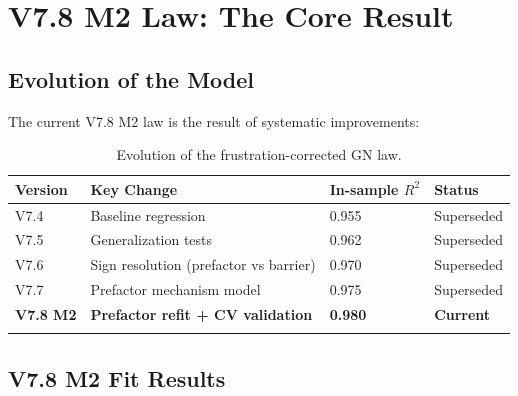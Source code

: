 \documentclass[11pt,a4paper]{article}
\begin{document}
\section{V7.8 M2 Law: The Core Result}
\label{sec:v78_m2}

\subsection{Evolution of the Model}

The current V7.8 M2 law is the result of systematic improvements:

\begin{longtable}{llll}
\toprule
\textbf{Version} & \textbf{Key Change} & \textbf{In-sample $R^2$} & \textbf{Status} \\
\midrule
\endhead
V7.4 & Baseline regression & 0.955 & Superseded \\
V7.5 & Generalization tests & 0.962 & Superseded \\
V7.6 & Sign resolution (prefactor vs barrier) & 0.970 & Superseded \\
V7.7 & Prefactor mechanism model & 0.975 & Superseded \\
\textbf{V7.8 M2} & \textbf{Prefactor refit + CV validation} & \textbf{0.980} & \textbf{Current} \\
\bottomrule
\caption{Evolution of the frustration-corrected GN law.}
\end{longtable}

\subsection{V7.8 M2 Fit Results}
\end{document}
